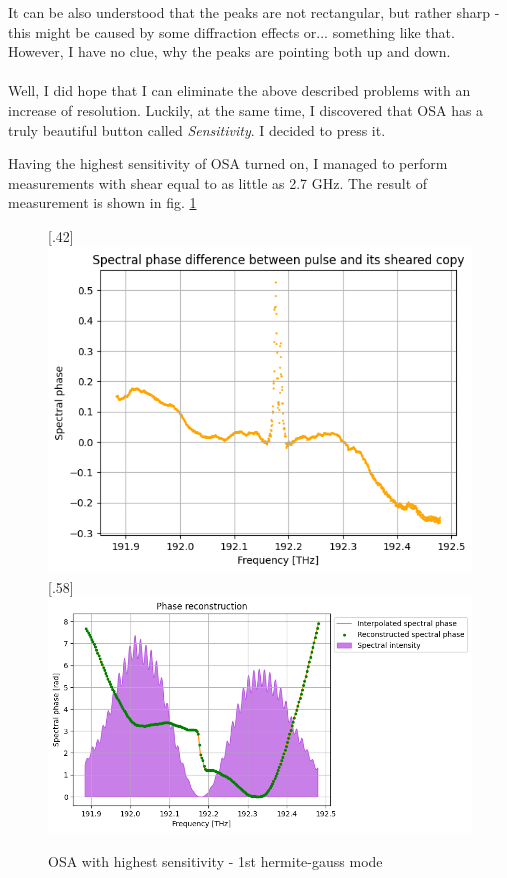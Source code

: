 \documentclass{article}
\begin{document}
It can be also understood that the peaks are not rectangular, but rather sharp - this might be caused by some diffraction effects or... something like that. However, I have no clue, why the peaks are pointing both up and down.\\
\\

Well, I did hope that I can eliminate the above described problems with an increase of resolution. Luckily, at the same time, I discovered that OSA has a truly beautiful button called \emph{Sensitivity}. I decided to press it.

Having the highest sensitivity of OSA turned on, I managed to perform measurements with shear equal to as little as 2.7 GHz. The result of measurement is shown in fig. \ref{sensitive}

\begin{figure}[H]

\caption{OSA with highest sensitivity - 1st hermite-gauss mode}
\subcaptionbox*{ }[.42\linewidth]{%
\includegraphics[width=\linewidth]{osa_high_diff}%
}
\hfill
\subcaptionbox*{ }[.58\linewidth]{%
\includegraphics[width=\linewidth]{osa_high_phase}%
}
\label{sensitive}
\end{figure}
\end{document}
